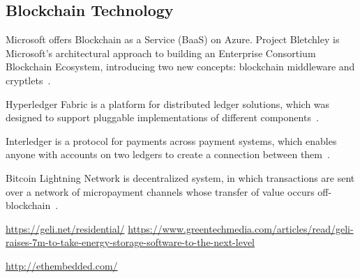 \subsection{Blockchain Technology}

Microsoft offers Blockchain as a Service (BaaS) on Azure.
Project Bletchley is Microsoft's architectural approach to building an Enterprise Consortium Blockchain Ecosystem, introducing two new concepts: blockchain middleware and cryptlets~\cite{gray2016introducing}.

Hyperledger Fabric is a platform for distributed ledger solutions, which was designed to support pluggable implementations of different components~\cite{hyperledger2017fabric}.

Interledger is a protocol for payments across payment systems, which enables anyone with accounts on two ledgers to create
a connection between them~\cite{thomas_protocol}.

Bitcoin Lightning Network is decentralized system, in which transactions are sent over a network of micropayment channels whose transfer of value occurs off-blockchain~\cite{poon2016bitcoin}.

\url{https://geli.net/residential/}
\url{https://www.greentechmedia.com/articles/read/geli-raises-7m-to-take-energy-storage-software-to-the-next-level}

\url{http://ethembedded.com/}

